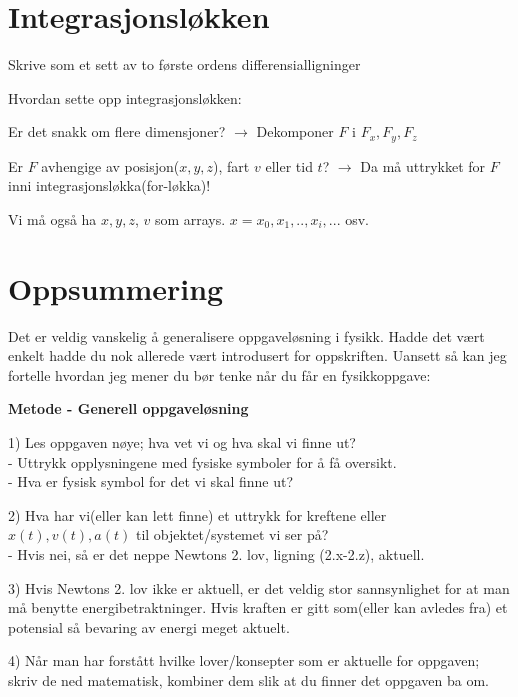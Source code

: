\documentclass[11pt,a4paper]{article}
\numberwithin{equation}{section}
\begin{document}
\section{Integrasjonsløkken}

Skrive som et sett av to første ordens differensialligninger

Hvordan sette opp integrasjonsløkken: 

Er det snakk om flere dimensjoner? $\to$ Dekomponer $F$ i $F_x,F_y,F_z$

Er $F$ avhengige av posisjon($x,y,z$), fart $v$ eller  tid $t$? $\to$ Da må uttrykket for $F$ inni integrasjonsløkka(for-løkka)! 

Vi må også ha $x,y,z$, $v$ som arrays. $x = x_0,x_1,..,x_i,..$. osv. 



\section{Oppsummering}

Det er veldig vanskelig å generalisere oppgaveløsning i fysikk. Hadde det vært enkelt hadde du nok allerede vært introdusert for oppskriften. Uansett så kan jeg fortelle hvordan jeg mener du bør tenke når du får en fysikkoppgave: 

\textbf{Metode - Generell oppgaveløsning}

1) Les oppgaven nøye; hva vet vi og hva skal vi finne ut? \\
- \quad Uttrykk opplysningene med fysiske symboler for å få oversikt.\\
- \quad Hva er fysisk symbol for det vi skal finne ut? 

2) Hva har vi(eller kan lett finne) et uttrykk for kreftene eller $x(t), v(t),a(t)$ til objektet/systemet vi ser på? \\
- \quad Hvis nei, så er det neppe Newtons 2. lov, ligning (2.x-2.z), aktuell. 

3) Hvis Newtons 2. lov ikke er aktuell, er det veldig stor sannsynlighet for at man må benytte energibetraktninger. Hvis kraften er gitt som(eller kan avledes fra) et potensial så bevaring av energi meget aktuelt.

4) Når man har forstått hvilke lover/konsepter som er aktuelle for oppgaven; skriv de ned matematisk, kombiner dem slik at du finner det oppgaven ba om. 
\end{document}
